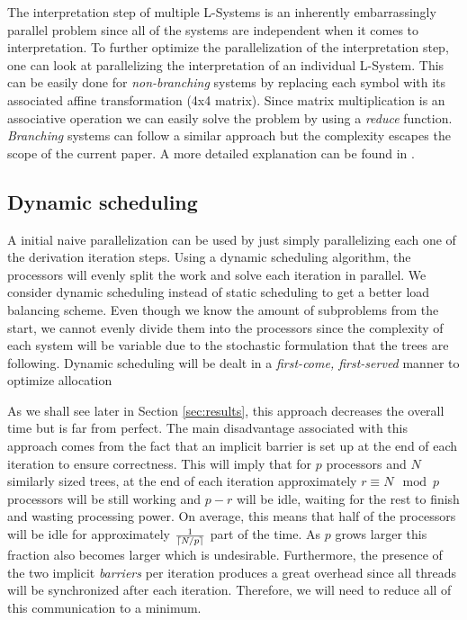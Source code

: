 \documentclass[letterpaper,twoside,11pt]{article}
\begin{document}
\begin{multicols}{2}
The interpretation step of multiple L-Systems is an inherently embarrassingly parallel problem since all of the systems are independent when it comes to interpretation. To further optimize the parallelization of the interpretation step, one can look at parallelizing the interpretation of an individual L-System. This can be easily done for \emph{non-branching} systems by replacing each symbol with its associated affine transformation (4x4 matrix). Since matrix multiplication is an associative operation we can easily solve the problem by using a \emph{reduce} function. \emph{Branching} systems can follow a similar approach but the complexity escapes the scope of the current paper. A more  detailed explanation can be found in \cite{LIPP-2010-PGMS}.

\subsection{Dynamic scheduling} %
\label{sub:dynamic_scheduling}


A initial naive parallelization can be used by just simply parallelizing each one of the derivation iteration steps. Using a dynamic scheduling algorithm, the processors will evenly split the work and solve each iteration in parallel. We consider dynamic scheduling instead of static scheduling to get a better load balancing scheme. Even though we know the amount of subproblems from the start, we cannot evenly divide them into the processors since the complexity of each system will be variable due to the  stochastic formulation that the trees are following. Dynamic scheduling will be dealt in a \emph{first-come, first-served} manner to optimize allocation

As we shall see later in Section \ref{sec:results}, this approach decreases the overall time but is far from perfect. The main disadvantage associated with this approach comes from the fact that an implicit barrier is set up at the end of each iteration to ensure correctness. This will imply that for $p$ processors and $N$ similarly sized trees, at the end of each iteration approximately $r \equiv N \mod p$ processors will be still working and $p - r$ will be idle, waiting for the rest to finish and wasting processing power. On average, this means that half of the processors will be idle for approximately $\frac{1}{\lceil N/p\rceil}$ part of the time. As $p$ grows larger this fraction also becomes larger which is undesirable. Furthermore, the presence of the two implicit \emph{barriers} per iteration produces a great overhead since all threads will be synchronized after each iteration. Therefore, we will need to reduce all of this communication to a minimum.


\end{multicols}
\end{document}
